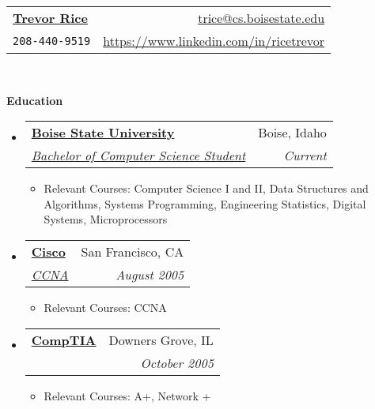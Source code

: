 \documentclass[letterpaper,11pt]{article}
\makeatletter
\newcommand{\resitem}[1]{\item #1 \vspace{-2pt}}
\newcommand{\resheading}[1]{{\large
    \colorbox{mygrey}{\begin{minipage}{\textwidth}{\textbf{#1
            \vphantom{p\^{E}}}}\end{minipage}}}}
\newcommand{\ressubheading}[4]{

  \begin{tabular*}{6.5in}{l@{\extracolsep{\fill}}r}
    \textbf{#1} & #2 \\
    \textit{#3} & \textit{#4} \\
  \end{tabular*}\vspace{-6pt}}
\makeatother
\begin{document}
\newcommand{\mywebheader}{
  \begin{tabular*}{7in}{l@{\extracolsep{\fill}}r}
    \textbf{\href{https://www.linkedin.com/in/ricetrevor}
    {\LARGE Trevor Rice}} & \href{mailto:trice@cs.boisestate.edu}{trice@cs.boisestate.edu}\\
    {\footnotesize \texttt{208-440-9519}} &
    \href{https://www.linkedin.com/in/ricetrevor} {https://www.linkedin.com/in/ricetrevor} \\
  \end{tabular*}
  \\
  \vspace{0.1in}}

\mywebheader

\resheading{Education}
\begin{itemize}
\item \ressubheading{\href{http://www.boisestate.edu}
		{Boise State University }}
		{Boise, Idaho }
		{\href{http://cs.boisestate.edu}
		{Bachelor of Computer Science Student}}
		{Current}
		{ \footnotesize
    \begin{itemize}
				\resitem{Relevant Courses: Computer Science I and II, Data Structures and
					Algorithms, Systems Programming, Engineering Statistics, Digital Systems,
					Microprocessors}
    \end{itemize}
		}

\item \ressubheading
	{\href{http://www.cisco.com/web/learning/certifications/associate/ccna/index.html}
		{Cisco }}{San Francisco, CA }{\href{http://www.cisco.com}{CCNA }}{    August 2005} { \footnotesize
    \begin{itemize}
      \resitem{Relevant Courses: CCNA}
    \end{itemize}
  }

\item \ressubheading
	{\href{http://certification.comptia.org}
		{CompTIA }}{Downers Grove, IL }{\href{http://www.comptia.org}{ }}{    October 2005} { \footnotesize
    \begin{itemize}
      \resitem{Relevant Courses: A+, Network +}
    \end{itemize}
  }

\end{itemize} %
\end{document}
